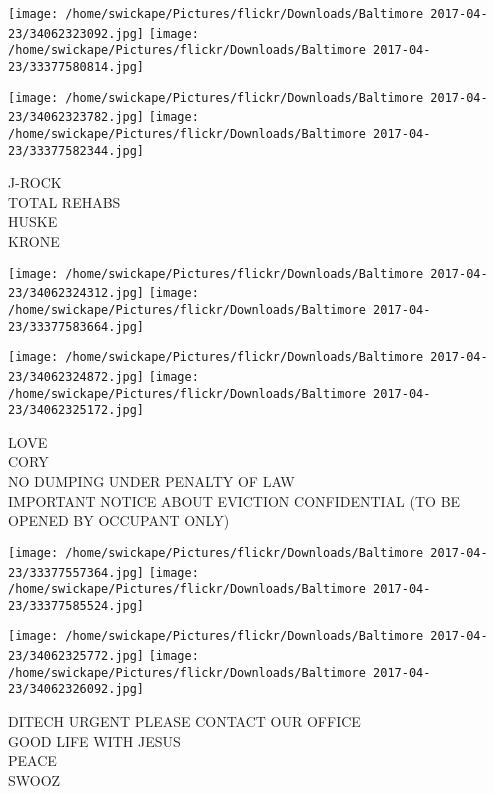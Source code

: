 \documentclass[10pt,letterpaper]{article}
\begin{document}
\texttt{[image: /home/swickape/Pictures/flickr/Downloads/Baltimore 2017-04-23/34062323092.jpg]}
\texttt{[image: /home/swickape/Pictures/flickr/Downloads/Baltimore 2017-04-23/33377580814.jpg]}

\texttt{[image: /home/swickape/Pictures/flickr/Downloads/Baltimore 2017-04-23/34062323782.jpg]}
\texttt{[image: /home/swickape/Pictures/flickr/Downloads/Baltimore 2017-04-23/33377582344.jpg]}

J{-}ROCK\\
TOTAL REHABS\\
HUSKE\\
KRONE
\pagebreak

\texttt{[image: /home/swickape/Pictures/flickr/Downloads/Baltimore 2017-04-23/34062324312.jpg]}
\texttt{[image: /home/swickape/Pictures/flickr/Downloads/Baltimore 2017-04-23/33377583664.jpg]}

\texttt{[image: /home/swickape/Pictures/flickr/Downloads/Baltimore 2017-04-23/34062324872.jpg]}
\texttt{[image: /home/swickape/Pictures/flickr/Downloads/Baltimore 2017-04-23/34062325172.jpg]}

LOVE\\
CORY\\
NO DUMPING UNDER PENALTY OF LAW\\
IMPORTANT NOTICE ABOUT EVICTION CONFIDENTIAL (TO BE OPENED BY OCCUPANT ONLY)
\pagebreak

\texttt{[image: /home/swickape/Pictures/flickr/Downloads/Baltimore 2017-04-23/33377557364.jpg]}
\texttt{[image: /home/swickape/Pictures/flickr/Downloads/Baltimore 2017-04-23/33377585524.jpg]}

\texttt{[image: /home/swickape/Pictures/flickr/Downloads/Baltimore 2017-04-23/34062325772.jpg]}
\texttt{[image: /home/swickape/Pictures/flickr/Downloads/Baltimore 2017-04-23/34062326092.jpg]}

DITECH URGENT PLEASE CONTACT OUR OFFICE\\
GOOD LIFE WITH JESUS\\
PEACE\\
SWOOZ
\pagebreak
\end{document}
